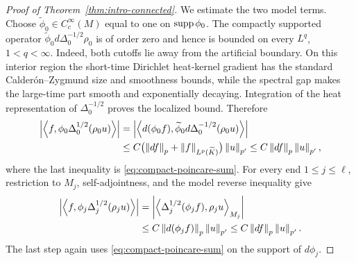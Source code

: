 \documentclass[12pt]{amsart}
\newcommand{\supp}{{\rm supp}{\hspace{.05cm}}}
\newcommand{\ip}[2]{\left\langle #1,#2\right\rangle}
\newcommand{\norm}[2]{\left\lVert #1\right\rVert_{#2}}
\newcommand{\abs}[1]{\left\lvert #1\right\rvert}
\theoremstyle{remark}
\begin{document}
\begin{proof}[Proof of Theorem~\ref{thm:intro-connected}]
We estimate the two model terms.  Choose
$\widetilde\phi_0\in C_c^\infty(M)$ equal to one on $\supp\phi_0$.  The
compactly supported operator
$\widetilde\phi_0d\Delta_0^{-1/2}\rho_0$ is of order zero and hence is
bounded on every $L^q$, $1<q<\infty$.  Indeed, both cutoffs lie away from
the artificial boundary.  On this interior region the short-time
Dirichlet heat-kernel gradient has the standard Calder\'on--Zygmund size
and smoothness bounds, while the spectral gap makes the large-time part
smooth and exponentially decaying.  Integration of the heat representation
of \(\Delta_0^{-1/2}\) proves the localized bound.  Therefore
\begin{align}
 \abs{\ip f{\phi_0\Delta_0^{1/2}(\rho_0u)}}
 &=\abs{\ip{d(\phi_0f)}
 {\widetilde\phi_0d\Delta_0^{-1/2}(\rho_0u)}}\notag\\
 &\leq C\bigl(\norm{df}{p}+\norm f{L^p(\widetilde K)}\bigr)\norm u{p'}
 \leq C\norm{df}{p}\norm u{p'},
 \label{eq:connected-core-model}
\end{align}
where the last inequality is \eqref{eq:compact-poincare-sum}.  For every
end $1\leq j\leq\ell$, restriction to \(M_j\), self-adjointness,
and the model reverse inequality give
\begin{align}
 \abs{\ip f{\phi_j\Delta_j^{1/2}(\rho_ju)}}
 &=\abs{\ip{\Delta_j^{1/2}(\phi_jf)}{\rho_ju}_{M_j}}\notag\\
 &\leq C\norm{d(\phi_jf)}p\norm u{p'}
 \leq C\norm{df}p\norm u{p'}.
 \label{eq:connected-end-model}
\end{align}
The last step again uses \eqref{eq:compact-poincare-sum} on the support of
$d\phi_j$.


\end{proof}
\end{document}
